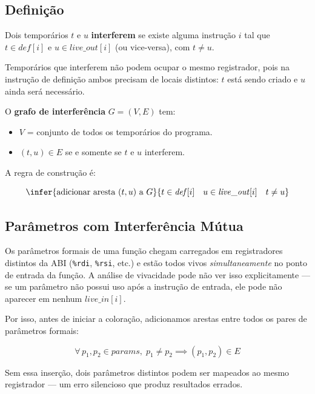 \subsection{Definição}

\begin{Definition}[Interferência]
  Dois temporários $t$ e $u$ \textbf{interferem} se existe alguma
  instrução $i$ tal que $t \in \mathit{def}[i]$ e
  $u \in \mathit{live\_out}[i]$ (ou vice-versa), com $t \neq u$.
\end{Definition}

Temporários que interferem não podem ocupar o mesmo registrador, pois na
instrução de definição ambos precisam de locais distintos: $t$ está sendo
criado e $u$ ainda será necessário.

O \textbf{grafo de interferência} $G = (V, E)$ tem:

\begin{itemize}
  \item $V$ = conjunto de todos os temporários do programa.
  \item $(t, u) \in E$ se e somente se $t$ e $u$ interferem.
\end{itemize}

A regra de construção é:

\[
  \infer{\text{adicionar aresta } (t, u) \text{ a } G}
  {t \in \mathit{def}[i] \quad u \in \mathit{live\_out}[i] \quad t \neq u}
\]

\subsection{Parâmetros com Interferência Mútua}

Os parâmetros formais de uma função chegam carregados em registradores
distintos da ABI (\texttt{\%rdi}, \texttt{\%rsi}, etc.) e estão todos
vivos \emph{simultaneamente} no ponto de entrada da função. A análise de
vivacidade pode não ver isso explicitamente — se um parâmetro não possui
uso após a instrução de entrada, ele pode não aparecer em nenhum
$\mathit{live\_in}[i]$.

Por isso, antes de iniciar a coloração, adicionamos arestas entre todos
os pares de parâmetros formais:

\[
  \forall\, p_1, p_2 \in \mathit{params},\; p_1 \neq p_2 \implies
  (p_1, p_2) \in E
\]

Sem essa inserção, dois parâmetros distintos podem ser mapeados ao mesmo
registrador — um erro silencioso que produz resultados errados.

